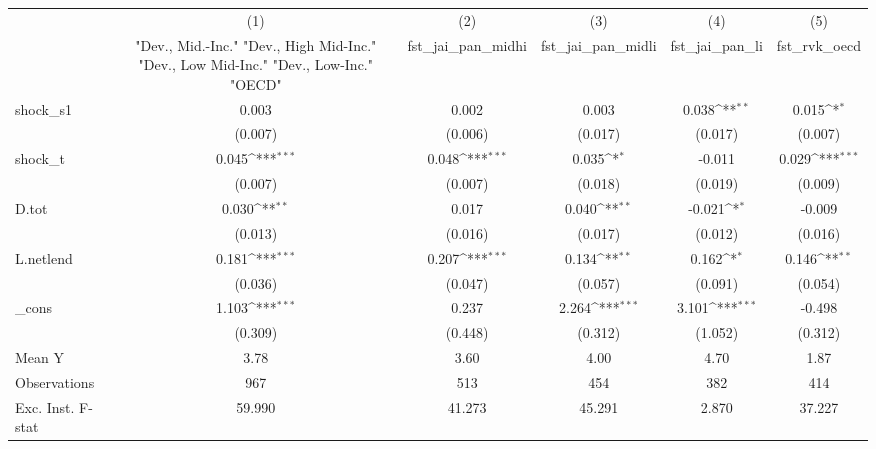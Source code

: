 {
\def\sym#1{\ifmmode^{#1}\else\(^{#1}\)\fi}
\begin{tabular}{l*{5}{c}}
\toprule
            &\multicolumn{1}{c}{(1)}&\multicolumn{1}{c}{(2)}&\multicolumn{1}{c}{(3)}&\multicolumn{1}{c}{(4)}&\multicolumn{1}{c}{(5)}\\
            &\multicolumn{1}{c}{ "Dev., Mid.-Inc." "Dev., High Mid-Inc." "Dev., Low Mid-Inc." "Dev., Low-Inc." "OECD" }&\multicolumn{1}{c}{fst\_jai\_pan\_midhi}&\multicolumn{1}{c}{fst\_jai\_pan\_midli}&\multicolumn{1}{c}{fst\_jai\_pan\_li}&\multicolumn{1}{c}{fst\_rvk\_oecd}\\
\midrule
shock\_s1    &       0.003         &       0.002         &       0.003         &       0.038\sym{**} &       0.015\sym{*}  \\
            &     (0.007)         &     (0.006)         &     (0.017)         &     (0.017)         &     (0.007)         \\
\addlinespace
shock\_t     &       0.045\sym{***}&       0.048\sym{***}&       0.035\sym{*}  &      -0.011         &       0.029\sym{***}\\
            &     (0.007)         &     (0.007)         &     (0.018)         &     (0.019)         &     (0.009)         \\
\addlinespace
D.tot       &       0.030\sym{**} &       0.017         &       0.040\sym{**} &      -0.021\sym{*}  &      -0.009         \\
            &     (0.013)         &     (0.016)         &     (0.017)         &     (0.012)         &     (0.016)         \\
\addlinespace
L.netlend   &       0.181\sym{***}&       0.207\sym{***}&       0.134\sym{**} &       0.162\sym{*}  &       0.146\sym{**} \\
            &     (0.036)         &     (0.047)         &     (0.057)         &     (0.091)         &     (0.054)         \\
\addlinespace
\_cons      &       1.103\sym{***}&       0.237         &       2.264\sym{***}&       3.101\sym{***}&      -0.498         \\
            &     (0.309)         &     (0.448)         &     (0.312)         &     (1.052)         &     (0.312)         \\
\midrule
Mean Y      &        3.78         &        3.60         &        4.00         &        4.70         &        1.87         \\
Observations&         967         &         513         &         454         &         382         &         414         \\
Exc. Inst. F-stat&      59.990         &      41.273         &      45.291         &       2.870         &      37.227         \\
\bottomrule
\end{tabular}
}
